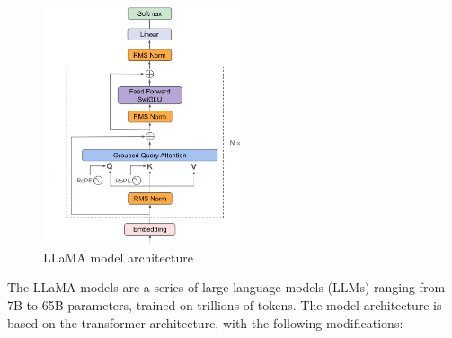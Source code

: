 \documentclass{article}
\begin{document}
		\begin{figure}[h]
			\centering
			\includegraphics[width=6cm]{llama}
			\caption{LLaMA model architecture}
		\end{figure}
		
		The LLaMA models \cite{touvron2023llamaopenefficientfoundation} are a series of large language models (LLMs) ranging from 7B to 65B parameters, trained on trillions of tokens. The model architecture is based on the transformer architecture, with the following modifications:
		
\end{document}
